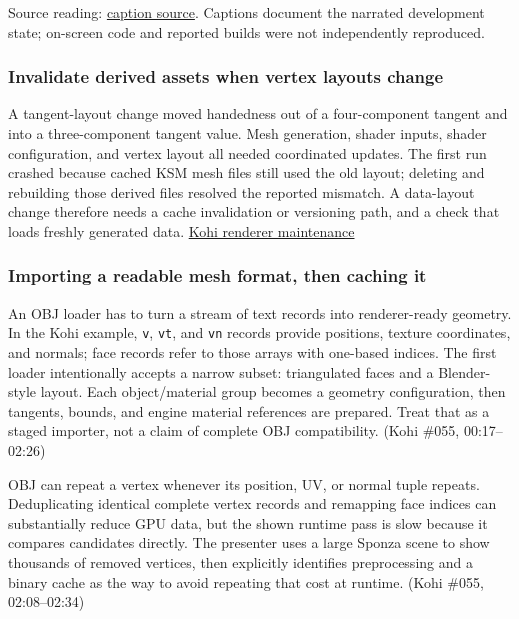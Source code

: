 Source reading: \href{https://www.youtube.com/watch?v=Uk2p3vKBMXE}{caption source}. Captions document the narrated development state; on-screen code and reported builds were not independently reproduced.

\subsubsection{Invalidate derived assets when vertex layouts change}\label{06-engine-ii-ch027-invalidate-derived-assets-when-vertex-layouts-change}

A tangent-layout change moved handedness out of a four-component tangent and into a three-component tangent value. Mesh generation, shader inputs, shader configuration, and vertex layout all needed coordinated updates. The first run crashed because cached KSM mesh files still used the old layout; deleting and rebuilding those derived files resolved the reported mismatch. A data-layout change therefore needs a cache invalidation or versioning path, and a check that loads freshly generated data. \href{https://www.youtube.com/watch?v=x8ao57nbMlY}{Kohi renderer maintenance}

\subsubsection{Importing a readable mesh format, then caching it}\label{06-engine-ii-ch027-importing-a-readable-mesh-format-then-caching-it}

An OBJ loader has to turn a stream of text records into renderer-ready geometry. In the Kohi example, \texttt{v}, \texttt{vt}, and \texttt{vn} records provide positions, texture coordinates, and normals; face records refer to those arrays with one-based indices. The first loader intentionally accepts a narrow subset: triangulated faces and a Blender-style layout. Each object/material group becomes a geometry configuration, then tangents, bounds, and engine material references are prepared. Treat that as a staged importer, not a claim of complete OBJ compatibility. (Kohi \#055, 00:17--02:26)

OBJ can repeat a vertex whenever its position, UV, or normal tuple repeats. Deduplicating identical complete vertex records and remapping face indices can substantially reduce GPU data, but the shown runtime pass is slow because it compares candidates directly. The presenter uses a large Sponza scene to show thousands of removed vertices, then explicitly identifies preprocessing and a binary cache as the way to avoid repeating that cost at runtime. (Kohi \#055, 02:08--02:34)

